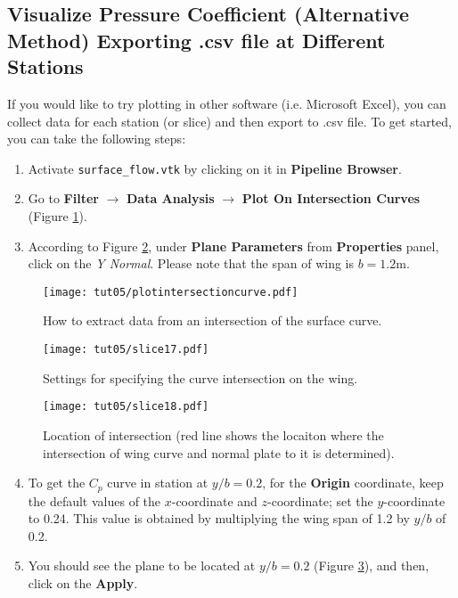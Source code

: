 \subsection{Visualize Pressure Coefficient (Alternative Method) Exporting .csv file at Different Stations}
If you would like to try plotting in other software (i.e. Microsoft Excel), you can collect data for each station (or slice) and then export to .csv file. To get started, you can take the following steps:
\begin{enumerate}[label=\arabic*)]
	\setcounter{enumi}{0}
	\item Activate \texttt{surface\_flow.vtk} by clicking on it in \textbf{Pipeline Browser}.
	\item Go to \textbf{Filter} $\rightarrow$ \textbf{Data Analysis} $\rightarrow$ \textbf{Plot On Intersection Curves} (Figure \ref{fig5:plotinintersectioncurve5}).
	\item According to Figure \ref{fig5:slice17}, under \textbf{Plane Parameters} from \textbf{Properties} panel, click on the \textit{Y Normal}. Please note that the span of wing is $b=1.2$m.
\end{enumerate}
\begin{figure}[ht]
    \centering
    \texttt{[image: tut05/plotintersectioncurve.pdf]}
    \caption{How to extract data from an intersection of the surface curve. }
    \label{fig5:plotinintersectioncurve5}
\end{figure}
\begin{figure}[ht]
	\centering
	\texttt{[image: tut05/slice17.pdf]}
	\caption{Settings for specifying the curve intersection on the wing.}
	\label{fig5:slice17}
\end{figure}
\begin{figure}[H]
	\centering
	\texttt{[image: tut05/slice18.pdf]}
	\caption{Location of intersection (red line shows the locaiton where the intersection of wing curve and normal plate to it is determined).}
	\label{fig5:slice18}
\end{figure}
\begin{enumerate}[label=\arabic*)]
	\setcounter{enumi}{3}
	\item To get the $C_p$ curve in station at $y/b=0.2$, for the \textbf{Origin} coordinate, keep the default values of the $x$-coordinate and $z$-coordinate; set the $y$-coordinate to 0.24. This value is obtained by multiplying the wing span of 1.2 by $y/b$ of 0.2.
	\item You should see the plane to be located at $y/b = 0.2$ (Figure \ref{fig5:slice18}), and then, click on the \textbf{Apply}. 
\end{enumerate}
